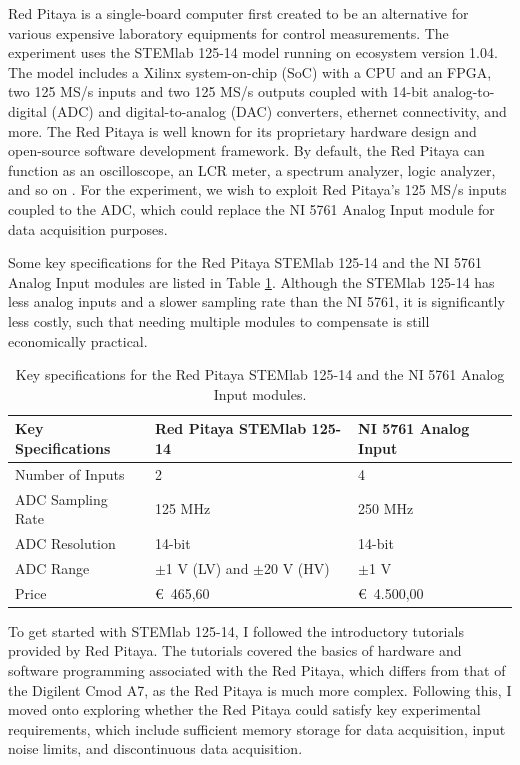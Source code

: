 \noindent Red Pitaya is a single-board computer first created to be an alternative for various expensive laboratory equipments for control measurements. The experiment uses the STEMlab 125-14 model running on ecosystem version 1.04. The model includes a Xilinx system-on-chip (SoC) with a CPU and an FPGA, two 125 MS/s inputs and two 125 MS/s outputs coupled with 14-bit analog-to-digital (ADC) and digital-to-analog (DAC) converters, ethernet connectivity, and more. The Red Pitaya is well known for its proprietary hardware design and open-source software development framework. By default, the Red Pitaya can function as an oscilloscope, an LCR meter, a spectrum analyzer, logic analyzer, and so on \cite{rp}. For the experiment, we wish to exploit Red Pitaya's 125 MS/s inputs coupled to the ADC, which could replace the NI 5761 Analog Input module for data acquisition purposes.

Some key specifications for the Red Pitaya STEMlab 125-14 and the NI 5761 Analog Input modules are listed in Table \ref{tab:rp_ni}. Although the STEMlab 125-14 has less analog inputs and a slower sampling rate than the NI 5761, it is significantly less costly, such that needing multiple modules to compensate is still economically practical.

\begin{table}[h!]
    \centering
    \begin{tabular}{ p{5cm} | p{6cm} | p{5cm} }
        \hline
        \textbf{Key Specifications} & \textbf{Red Pitaya STEMlab 125-14}
            & \textbf{NI 5761 Analog Input} \\
        \hline
        Number of Inputs & 2 & 4 \\
        ADC Sampling Rate & 125 MHz & 250 MHz \\
        ADC Resolution & 14-bit & 14-bit \\
        ADC Range & $\pm$1 V (LV) and $\pm$20 V (HV) & $\pm$1 V \\
        Price & \euro\ 465,60 & \euro\ 4.500,00 \\
        \hline
    \end{tabular}
    \caption{Key specifications for the Red Pitaya STEMlab 125-14 and the NI 5761 Analog Input modules.}
    \label{tab:rp_ni}
\end{table}

To get started with STEMlab 125-14, I followed the introductory tutorials provided by Red Pitaya. The tutorials covered the basics of hardware and software programming associated with the Red Pitaya, which differs from that of the Digilent Cmod A7, as the Red Pitaya is much more complex. Following this, I moved onto exploring whether the Red Pitaya could satisfy key experimental requirements, which include sufficient memory storage for data acquisition, input noise limits, and discontinuous data acquisition.

